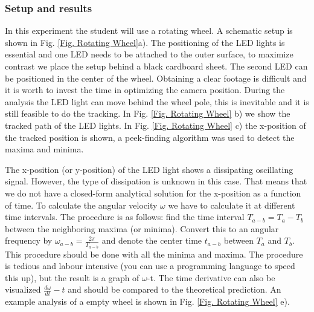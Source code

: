 \documentclass{article}
\begin{document}
\subsubsection{Setup and results}
In this experiment the student will use a rotating wheel. A schematic setup is shown in Fig. \ref{Fig. Rotating Wheel}a). The positioning of the LED lights is essential and one LED needs to be attached to the outer surface, to maximize contrast we place the setup behind a black cardboard sheet. The second LED can be positioned in the center of the wheel. Obtaining a clear footage is difficult and it is worth to invest the time in optimizing the camera position. During the analysis the LED light can move behind the wheel pole, this is inevitable and it is still feasible to do the tracking. In Fig. \ref{Fig. Rotating Wheel} b) we show the tracked path of the LED lights. In Fig. \ref{Fig. Rotating Wheel} c) the x-position of the tracked position is shown, a peek-finding algorithm was used to detect the maxima and minima.

The x-position (or y-position) of the LED light shows a dissipating oscillating signal. However, the type of dissipation is unknown in this case. That means that we do not have a closed-form analytical solution for the x-position as a function of time. To calculate the angular velocity $\omega$ we have to calculate it at different time intervals. The procedure is as follows: find the time interval $T_{a-b}=T_a-T_b$ between the neighboring maxima (or minima). Convert this to an angular frequency by $\omega_{a-b} = \frac{2\pi}{T_{a-b}}$ and denote the center time $t_{a-b}$ between $T_a$ and $T_b$. This procedure should be done with all the minima and maxima. The procedure is tedious and labour intensive (you can use a programming language to speed this up), but the result is a graph of $\omega$-t. The time derivative can also be visualized $\frac{d\omega}{dt}-t$ and should be compared to the theoretical prediction. An example analysis of a empty wheel is shown in Fig. \ref{Fig. Rotating Wheel} e).
\end{document}

